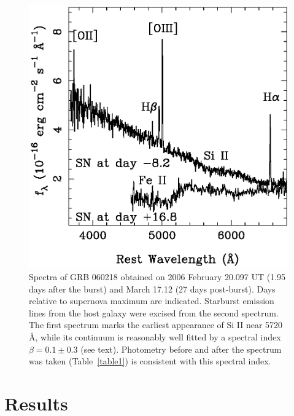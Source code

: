 \documentclass[apj]{emulateapj}
\begin{document}
\begin{figure}[t]
\centerline{
  \includegraphics[width=0.97\linewidth]{f2.eps}\hfill
}
\caption{Spectra of GRB 060218 obtained on 2006 February 20.097 UT (1.95 days
after the burst) and March 17.12 (27 days post-burst).  Days relative
to supernova maximum are indicated.  Starburst emission lines from the host
galaxy were excised from the second spectrum.
The first spectrum marks the earliest appearance
of Si II near 5720 \AA, while its continuum
is reasonably well fitted by a spectral index $\beta =
0.1 \pm 0.3$ (see text).  Photometry before and after the spectrum was taken
(Table~\ref{table1}) is consistent with this spectral index.}
\label{spectrum}
\end{figure}


\section{Results}
\end{document}
